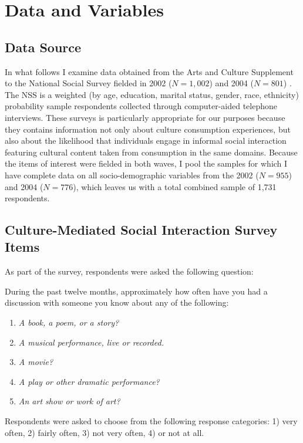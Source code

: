 \section{Data and Variables}
\subsection{Data Source}
In what follows I examine data obtained from the Arts and Culture Supplement to the National Social Survey fielded in 2002 ($N=1,002$) and 2004 ($N=801$) \citep{NSS2002, NSS2004}.  The NSS is a weighted (by age, education, marital status, gender, race, ethnicity) probability sample respondents collected through computer-aided telephone interviews.   These surveys is particularly appropriate for our purposes because they contains information not only about culture consumption experiences, but also about the likelihood that individuals engage in informal social interaction featuring cultural content taken from consumption in the same domains.  Because the items of interest were fielded in both waves, I pool the samples for which I have complete data on all socio-demographic variables from the 2002 ($N=955$) and 2004 ($N=776$), which leaves us with a total combined sample of 1,731 respondents.

\subsection{Culture-Mediated Social Interaction Survey Items}
As part of the survey, respondents were asked the following question:

During the past twelve months, approximately how often have you had a discussion with someone you know about any of the following:
\begin{enumerate}
\item  \emph{A book, a poem, or a story?}
\item  \emph{A musical performance, live or recorded.}
\item  \emph{A movie?}
\item  \emph{A play or other dramatic performance?}
\item  \emph{An art show or work of art?}
\end{enumerate}

Respondents were asked to choose from the following response categories: 1) very often, 2) fairly often, 3) not very often, 4) or not at all. 
 
